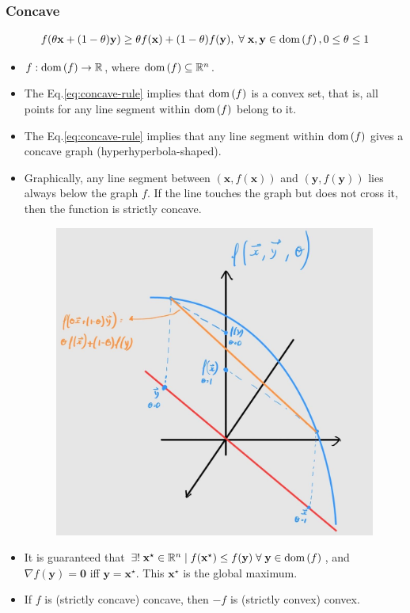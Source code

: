 \documentclass{article}
\newcommand{\dom}[1]{\ensuremath{\textnormal{dom}\left(#1\right)}} %
\begin{document}
\subsubsection{Concave}
\begin{align}
	f(\theta\mathbf{x}+(1-\theta)\mathbf{y}) \geq \theta f(\mathbf{x}) + (1-\theta)f(\mathbf{y}),\;\forall\; \mathbf{x}, \mathbf{y} \in \dom{f}, 0\leq\theta\leq 1
	\label{eq:concave-rule}
\end{align}
\begin{itemize}
	\item \(f: \dom{f} \rightarrow \mathbb{R}\), where \(\dom{f} \subseteq \mathbb{R}^{n}\).
	\item The Eq.\eqref{eq:concave-rule} implies that \(\dom{f}\) is a convex set, that is, all points for any line segment within \(\dom{f}\) belong to it.
	\item The Eq.\eqref{eq:concave-rule} implies that any line segment within \(\dom{f}\) gives a concave graph (hyperhyperbola-shaped).
	\item Graphically, any line segment between \((\mathbf{x}, f(\mathbf{x}))\) and \((\mathbf{y}, f(\mathbf{y}))\) lies always below the graph \(f\). If the line touches the graph but does not cross it, then the function is strictly concave.
	      \begin{figure}[H]
		      \centering
		      \includegraphics[scale=.2]{figs/concave.png}
	      \end{figure}
	\item It is guaranteed that \(\exists!\; \mathbf{x}^{\star} \in \mathbb{R}^{n} \mid f(\mathbf{x}^{\star}) \leq f(\mathbf{y})\;\forall\;\mathbf{y}\in\dom{f}\), and \(\nabla f(\mathbf{y}) = \mathbf{0}\) iff \(\mathbf{y} = \mathbf{x}^{\star}\). This \(\mathbf{x}^{\star}\) is the global maximum.
	\item If \(f\) is (strictly concave) concave, then \(-f\) is (strictly convex) convex.
\end{itemize}
\end{document}
